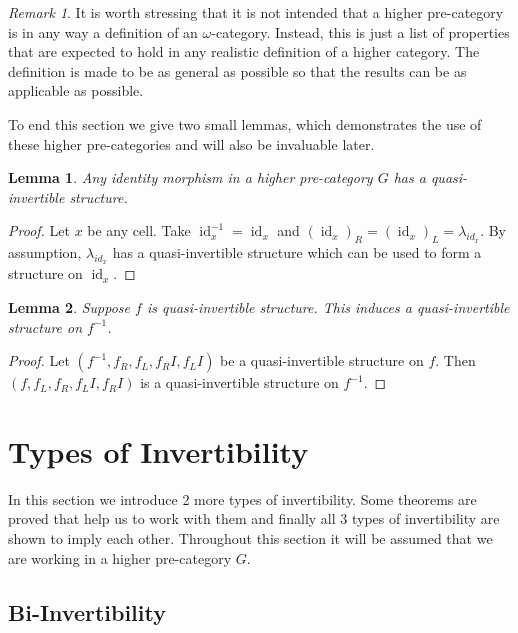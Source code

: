 \documentclass{article}
\newtheorem{lemma}{Lemma}
\theoremstyle{definition}
\theoremstyle{remark}
\newtheorem{remark}{Remark}
\DeclareMathOperator{\id}{id}
\newcommand{\inv}[1]{#1^{-1}}
\begin{document}
\begin{remark}
  It is worth stressing that it is not intended that a higher pre-category is in any way a definition of an \(\omega\)-category. Instead, this is just a list of properties that are expected to hold in any realistic definition of a higher category. The definition is made to be as general as possible so that the results can be as applicable as possible.
\end{remark}

To end this section we give two small lemmas, which demonstrates the use of these higher pre-categories and will also be invaluable later.

\begin{lemma}\label{identity}
  Any identity morphism in a higher pre-category \(G\) has a quasi-invertible structure.
\end{lemma}

\begin{proof}
  Let \(x\) be any cell. Take \(\inv {\id_x} = \id_x\) and \({(\id_x)}_R = {(\id_x)}_L = \lambda_{id_x}\). By assumption, \(\lambda_{id_x}\) has a quasi-invertible structure which can be used to form a structure on \(\id_x\).
\end{proof}

\begin{lemma}\label{inverse-invert}
  Suppose \(f\) is quasi-invertible structure. This induces a quasi-invertible structure on \(\inv f\).
\end{lemma}

\begin{proof}
  Let \((\inv f, f_R, f_L, f_R{}I, f_L{}I)\) be a quasi-invertible structure on \(f\). Then \((f , f_L, f_R, f_L{}I, f_R{}I)\) is a quasi-invertible structure on \(\inv f\).
\end{proof}

\section{Types of Invertibility}\label{sec:invertibility}

In this section we introduce 2 more types of invertibility. Some theorems are proved that help us to work with them and finally all 3 types of invertibility are shown to imply each other. Throughout this section it will be assumed that we are working in a higher pre-category \(G\).

\subsection{Bi-Invertibility}\label{sec:bi-invertibility}
\end{document}
